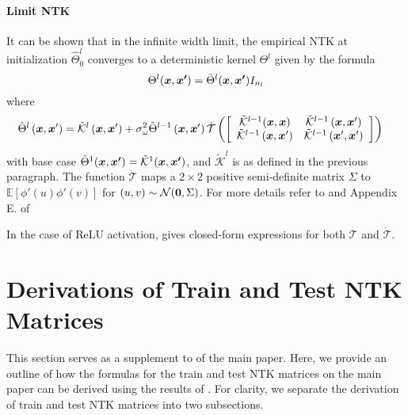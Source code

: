 \paragraph{Limit NTK} It can be shown that in the infinite width limit, the empirical NTK at initialization $\hat{\Theta}^l_0$ converges to a deterministic kernel $\Theta^l$ given by the formula
$$\Theta^l(\boldsymbol{x}, \boldsymbol{x'}) = \tilde{\Theta}^l(\boldsymbol{x}, \boldsymbol{x'}) I_{n_l}$$
where 
\begin{align}
    \tilde{\Theta}^l&\left(\boldsymbol{x}, \boldsymbol{x}^{\prime}\right) =\tilde{\mathcal{K}}^l\left(\boldsymbol{x}, \boldsymbol{x}^{\prime}\right)+ \sigma_\omega^2 \tilde{\Theta}^{l-1}\left(\boldsymbol{x}, \boldsymbol{x}^{\prime}\right) \dot{\mathcal{T}}\left(\left[\begin{array}{cc}
\tilde{\mathcal{K}}^{l-1}(\boldsymbol{x}, \boldsymbol{x}) & \tilde{\mathcal{K}}^{l-1}\left(\boldsymbol{x}, \boldsymbol{x}^{\prime}\right) \\
\tilde{\mathcal{K}}^{l-1}\left(\boldsymbol{x}, \boldsymbol{x}^{\prime}\right) & \tilde{\mathcal{K}}^{l-1}\left(\boldsymbol{x}^{\prime}, \boldsymbol{x}^{\prime}\right)
\end{array}\right]\right)
\label{eq:recur_Theta}
\end{align}
with base case $\tilde{\Theta}^1(\boldsymbol{x},\boldsymbol{x'})=\tilde{\mathcal{K}}^1(\boldsymbol{x}, \boldsymbol{x'})$, and $\tilde{\mathcal{K}}^l$ is as defined in the previous paragraph. The function $\dot{\mathcal{T}}$ maps a $2\times 2$ positive semi-definite matrix $\Sigma$ to $\mathbb{E}[\phi'(u)\phi'(v)]$ for $(u, v) \sim \mathcal{N}(\boldsymbol{0}, \Sigma)$. For more details refer to \cite{NEURIPS2018_5a4be1fa} and Appendix E. of \cite{NEURIPS2019_0d1a9651}

\begin{remark}
In the case of ReLU activation,  gives closed-form expressions for both $\mathcal{T}$ and $\mathcal{\dot{T}}$.
\end{remark}

\section{Derivations of Train and Test NTK Matrices}
\label{app:derivations}
This section serves as a supplement to  of the main paper. Here, we provide an outline of how the formulas for the train and test NTK matrices on the main paper can be derived using the results of . For clarity, we separate the derivation of train and test NTK matrices into two subsections.

